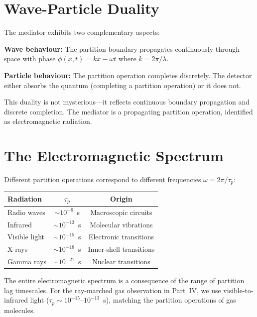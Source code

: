 \documentclass[twocolumn,10pt,a4paper]{article}
\theoremstyle{plain}
\theoremstyle{definition}
\theoremstyle{remark}
\newcommand{\taup}{\tau_p}
\begin{document}
\section{Wave-Particle Duality}
\label{sec:duality}

The mediator exhibits two complementary aspects:

\textbf{Wave behaviour:} The partition boundary propagates continuously through space with phase $\phi(x,t) = kx - \omega t$ where $k = 2\pi/\lambda$.

\textbf{Particle behaviour:} The partition operation completes discretely. The detector either absorbs the quantum (completing a partition operation) or it does not.

This duality is not mysterious---it reflects continuous boundary propagation and discrete completion. The mediator is a propagating partition operation, identified as electromagnetic radiation.

\section{The Electromagnetic Spectrum}
\label{sec:spectrum}

Different partition operations correspond to different frequencies $\omega = 2\pi/\taup$:
\begin{center}
\begin{tabular}{lcc}
\toprule
\textbf{Radiation} & $\taup$ & \textbf{Origin} \\
\midrule
Radio waves    & $\sim 10^{-6}$~s  & Macroscopic circuits \\
Infrared       & $\sim 10^{-13}$~s & Molecular vibrations \\
Visible light  & $\sim 10^{-15}$~s & Electronic transitions \\
X-rays         & $\sim 10^{-18}$~s & Inner-shell transitions \\
Gamma rays     & $\sim 10^{-21}$~s & Nuclear transitions \\
\bottomrule
\end{tabular}
\end{center}

The entire electromagnetic spectrum is a consequence of the range of partition lag timescales. For the ray-marched gas observation in Part~IV, we use visible-to-infrared light ($\taup \sim 10^{-15}$--$10^{-13}$~s), matching the partition operations of gas molecules.

\end{document}

